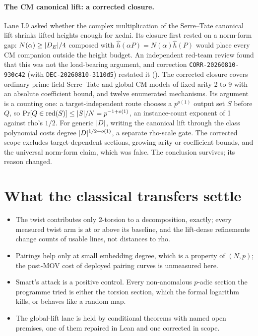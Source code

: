 \paragraph{The CM canonical lift: a corrected closure.} Lane L9 asked
whether the complex multiplication of the Serre--Tate canonical lift shrinks
lifted heights enough for xedni. Its closure first rested on a norm-form
gap: $N(\alpha)\ge\lvert D_E \rvert/4$ composed with
$\hat h(\alpha P)=N(\alpha)\hat h(P)$ would place every CM companion outside
the height budget. An independent red-team review found that this was not
the load-bearing argument, and correction \texttt{CORR-20260810-930c42}
(with \texttt{DEC-20260810-3110d5}) restated it
().
The corrected closure covers ordinary prime-field Serre--Tate and global CM
models of fixed arity 2 to 9 with an absolute coefficient bound, and
twelve enumerated mechanisms. Its argument is a counting one: a
target-independent route chooses a $p^{o(1)}$ output set $S$ before $Q$, so
$\Pr[Q\in\operatorname{red}(S)]\le\lvert S \rvert/N=p^{-1+o(1)}$, an instance-count
exponent of 1 against rho's $1/2$. For generic $\lvert D \rvert$, writing the
canonical lift through the class polynomial costs degree $\lvert D \rvert^{1/2+o(1)}$,
a separate rho-scale gate. The corrected scope excludes target-dependent
sections, growing arity or coefficient bounds, and the universal norm-form
claim, which was false. The conclusion survives; its reason changed.

\section{What the classical transfers settle}\label{sec:tp-summary}

\begin{itemize}
\item The twist contributes only 2-torsion to a decomposition, exactly;
  every measured twist arm is at or above its baseline, and the lift-dense
  refinements change counts of usable lines, not distances to rho.
\item Pairings help only at small embedding degree, which is a property of
  $(N,p)$; the post-MOV cost of deployed pairing curves is unmeasured here.
\item Smart's attack is a positive control. Every non-anomalous $p$-adic
  section the programme tried is either the torsion section, which the
  formal logarithm kills, or behaves like a random map.
\item The global-lift lane is held by conditional theorems with named open
  premises, one of them repaired in Lean and one corrected in scope.
\end{itemize}
